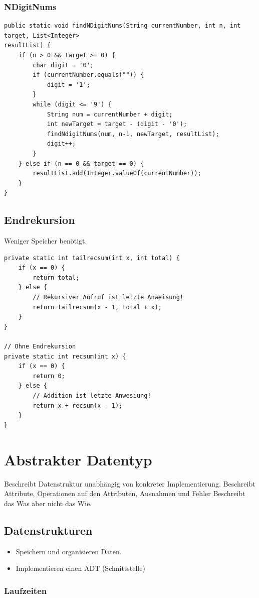 \begin{multicols*}{4}
 	\subsubsection{NDigitNums}
		\begin{lstlisting}
public static void findNDigitNums(String currentNumber, int n, int target, List<Integer>
resultList) {
	if (n > 0 && target >= 0) {
		char digit = '0';
		if (currentNumber.equals("")) {
			digit = '1';
		}
		while (digit <= '9') {
			String num = currentNumber + digit;
			int newTarget = target - (digit - '0');
			findNdigitNums(num, n-1, newTarget, resultList);
			digit++;
		}
	} else if (n == 0 && target == 0) {
		resultList.add(Integer.valueOf(currentNumber));
	}
}
		\end{lstlisting}

	\subsection{Endrekursion}
	Weniger Speicher benötigt.
		\begin{lstlisting}
private static int tailrecsum(int x, int total) {
	if (x == 0) {
		return total;
	} else {
		// Rekursiver Aufruf ist letzte Anweisung!
		return tailrecsum(x - 1, total + x);
	}
}

// Ohne Endrekursion
private static int recsum(int x) {
	if (x == 0) {
		return 0;
	} else {
		// Addition ist letzte Anwesiung!
		return x + recsum(x - 1);
	}
}
		\end{lstlisting}

\section{Abstrakter Datentyp}
Beschreibt Datenstruktur unabhängig von konkreter Implementierung.
Beschreibt Attribute, Operationen auf den Attributen, Ausnahmen und Fehler
Beschreibt das Was aber nicht das Wie.

\subsection{Datenstrukturen}
	\begin{itemize}
		\item Speichern und organisieren Daten.
		\item Implementieren einen ADT (Schnittstelle)
	\end{itemize}

	\subsubsection{Laufzeiten}


\end{multicols*}
